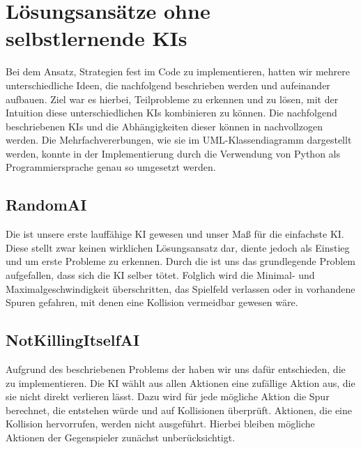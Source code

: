 \section{Lösungsansätze ohne selbstlernende KIs}
\label{sec:loesungsansatz-ohne-selbstlernende-kis}

Bei dem Ansatz, Strategien fest im Code zu implementieren, hatten wir mehrere unterschiedliche Ideen,
die nachfolgend beschrieben werden und aufeinander aufbauen.
Ziel war es hierbei, Teilprobleme zu erkennen und zu lösen, mit der Intuition diese unterschiedlichen \ac{KI}s
kombinieren zu können.
Die nachfolgend beschriebenen \ac{KI}s und die Abhängigkeiten dieser können in 
nachvollzogen werden.
Die Mehrfachvererbungen, wie sie im UML-Klassendiagramm dargestellt werden, konnte in der Implementierung durch die
Verwendung von Python als Programmiersprache genau so umgesetzt werden.

\subsection{RandomAI}
\label{subsec:random-ai}

Die  ist unsere erste lauffähige KI gewesen und unser Maß für die einfachste \ac{KI}.
Diese stellt zwar keinen wirklichen Lösungsansatz dar, diente jedoch als Einstieg und um erste Probleme zu erkennen.
Durch die  ist uns das grundlegende Problem aufgefallen, dass sich die \ac{KI} selber tötet.
Folglich wird die Minimal- und Maximalgeschwindigkeit überschritten, das Spielfeld verlassen oder in vorhandene Spuren
gefahren, mit denen eine Kollision vermeidbar gewesen wäre.

\subsection{NotKillingItselfAI}
\label{subsec:notkillingitself-ai}

Aufgrund des beschriebenen Problems der  haben wir uns dafür entschieden, die 
zu implementieren.
Die \ac{KI} wählt aus allen Aktionen eine zufällige Aktion aus, die sie nicht direkt verlieren lässt.
Dazu wird für jede mögliche Aktion die Spur berechnet, die entstehen würde und auf Kollisionen überprüft.
Aktionen, die eine Kollision hervorrufen, werden nicht ausgeführt.
Hierbei bleiben mögliche Aktionen der Gegenspieler zunächst unberücksichtigt. \\

